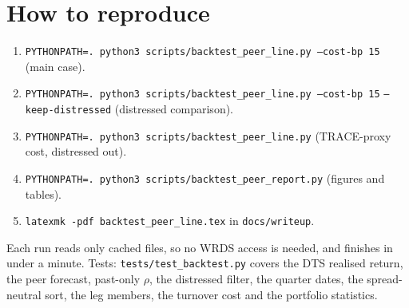 \documentclass[11pt,a4paper]{article}
\newcommand{\code}[1]{\texttt{\small #1}}
\begin{document}
\section{How to reproduce}
\begin{enumerate}
\item \code{PYTHONPATH=. python3 scripts/backtest\_peer\_line.py --cost-bp 15} (main case).
\item \code{PYTHONPATH=. python3 scripts/backtest\_peer\_line.py --cost-bp 15} \code{--keep-distressed} (distressed comparison).
\item \code{PYTHONPATH=. python3 scripts/backtest\_peer\_line.py} (TRACE-proxy cost, distressed out).
\item \code{PYTHONPATH=. python3 scripts/backtest\_peer\_report.py} (figures and tables).
\item \code{latexmk -pdf backtest\_peer\_line.tex} in \code{docs/writeup}.
\end{enumerate}
Each run reads only cached files, so no WRDS access is needed, and finishes in under a minute. Tests: \code{tests/test\_backtest.py} covers the DTS realised return, the peer forecast, past-only $\rho$, the distressed filter, the quarter dates, the spread-neutral sort, the leg members, the turnover cost and the portfolio statistics.
\end{document}
